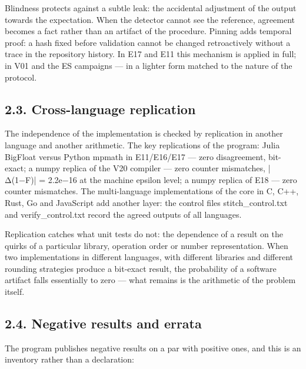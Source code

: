 \documentclass[11pt,a4paper]{article}
\begin{document}
Blindness protects against a subtle leak: the accidental adjustment of the output towards the expectation. When the detector cannot see the reference, agreement becomes a fact rather than an artifact of the procedure. Pinning adds temporal proof: a hash fixed before validation cannot be changed retroactively without a trace in the repository history. In E17 and E11 this mechanism is applied in full; in V01 and the ES campaigns — in a lighter form matched to the nature of the protocol.

\subsection{2.3. Cross-language replication}

The independence of the implementation is checked by replication in another language and another arithmetic. The key replications of the program: Julia BigFloat versus Python mpmath in E11/E16/E17 — zero disagreement, bit-exact; a numpy replica of the V20 compiler — zero counter mismatches, |Δ(1−F)| = 2.2e−16 at the machine epsilon level; a numpy replica of E18 — zero counter mismatches. The multi-language implementations of the core in C, C++, Rust, Go and JavaScript add another layer: the control files stitch\_control.txt and verify\_control.txt record the agreed outputs of all languages.

Replication catches what unit tests do not: the dependence of a result on the quirks of a particular library, operation order or number representation. When two implementations in different languages, with different libraries and different rounding strategies produce a bit-exact result, the probability of a software artifact falls essentially to zero — what remains is the arithmetic of the problem itself.

\subsection{2.4. Negative results and errata}

The program publishes negative results on a par with positive ones, and this is an inventory rather than a declaration:
\end{document}
